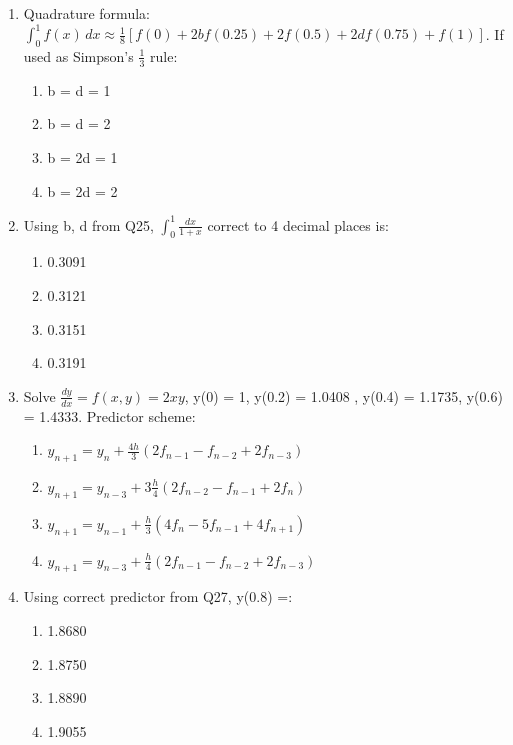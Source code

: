 \documentclass[journal,cmex10]{IEEEtran}
\theoremstyle{remark}
\numberwithin{equation}{enumi}
\numberwithin{figure}{enumi}
\begin{document}
\begin{enumerate}[label=\arabic*)]
    \item Quadrature formula: $\int_0^1 f(x) \, dx \approx \frac{1}{8} \left[ f(0) + 2b f(0.25) + 2 f(0.5) + 2d f(0.75) + f(1) \right]$. If used as Simpson’s $\frac{1}{3}$ rule:
    \bigskip
    \hfill {}
    \begin{enumerate}[label=\alph*)]
        \item b = d = 1
        \item b = d = 2
        \item b = 2d = 1
        \item b = 2d = 2 
    \end{enumerate}
    \bigskip

    \item Using b, d  from Q25, $\int_0^1 \frac{dx}{1+x}$ correct to 4 decimal places is:
    \bigskip
    \hfill {}
    \begin{enumerate}[label=\alph*)]
        \item 0.3091
        \item 0.3121
        \item 0.3151
        \item 0.3191
    \end{enumerate}
    \newpage

    \item Solve $\frac{dy}{dx} = f(x,y) = 2xy$, y(0) = 1, y(0.2) = 1.0408 , y(0.4) = 1.1735, y(0.6) = 1.4333. Predictor scheme:
    \bigskip
    \hfill {}
    \begin{enumerate}[label=\alph*)]
        \item $y_{n+1} = y_n + \frac{4h}{3} (2f_{n-1} - f_{n-2} + 2f_{n-3})$
        \vspace{0.1cm}
        \item $y_{n+1} = y_{n-3} + 3\frac{h}{4} (2f_{n-2} - f_{n-1} + 2f_n)$
        \vspace{0.1cm}
        \item $y_{n+1} = y_{n-1} + \frac{h}{3} (4f_n - 5f_{n-1} + 4f_{n+1}) $
        \vspace{0.1cm}
        \item $y_{n+1} = y_{n-3} + \frac{h}{4} (2f_{n-1} - f_{n-2} + 2f_{n-3})$
    \end{enumerate}
    \bigskip

    \item Using correct predictor from Q27, y(0.8) =:
    \bigskip
    \hfill {}
    \begin{enumerate}[label=\alph*)]
        \item 1.8680
        \item 1.8750
        \item 1.8890
        \item 1.9055
    \end{enumerate}
    \bigskip

\end{enumerate}
\end{document}
